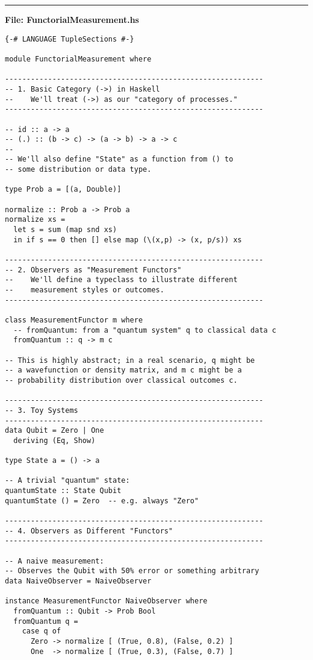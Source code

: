 \documentclass[12pt]{article}
\begin{document}
\noindent\rule{\textwidth}{0.4pt}
\textbf{File: FunctorialMeasurement.hs}
\begin{verbatim}
{-# LANGUAGE TupleSections #-}

module FunctorialMeasurement where

------------------------------------------------------------
-- 1. Basic Category (->) in Haskell
--    We'll treat (->) as our "category of processes."
------------------------------------------------------------

-- id :: a -> a
-- (.) :: (b -> c) -> (a -> b) -> a -> c
--
-- We'll also define "State" as a function from () to 
-- some distribution or data type.

type Prob a = [(a, Double)]

normalize :: Prob a -> Prob a
normalize xs =
  let s = sum (map snd xs)
  in if s == 0 then [] else map (\(x,p) -> (x, p/s)) xs

------------------------------------------------------------
-- 2. Observers as "Measurement Functors"
--    We'll define a typeclass to illustrate different
--    measurement styles or outcomes.
------------------------------------------------------------

class MeasurementFunctor m where
  -- fromQuantum: from a "quantum system" q to classical data c
  fromQuantum :: q -> m c

-- This is highly abstract; in a real scenario, q might be
-- a wavefunction or density matrix, and m c might be a 
-- probability distribution over classical outcomes c.

------------------------------------------------------------
-- 3. Toy Systems
------------------------------------------------------------
data Qubit = Zero | One
  deriving (Eq, Show)

type State a = () -> a

-- A trivial "quantum" state: 
quantumState :: State Qubit
quantumState () = Zero  -- e.g. always "Zero"

------------------------------------------------------------
-- 4. Observers as Different "Functors"
------------------------------------------------------------

-- A naive measurement: 
-- Observes the Qubit with 50% error or something arbitrary
data NaiveObserver = NaiveObserver

instance MeasurementFunctor NaiveObserver where
  fromQuantum :: Qubit -> Prob Bool
  fromQuantum q = 
    case q of
      Zero -> normalize [ (True, 0.8), (False, 0.2) ]
      One  -> normalize [ (True, 0.3), (False, 0.7) ]


\end{verbatim}
\end{document}
